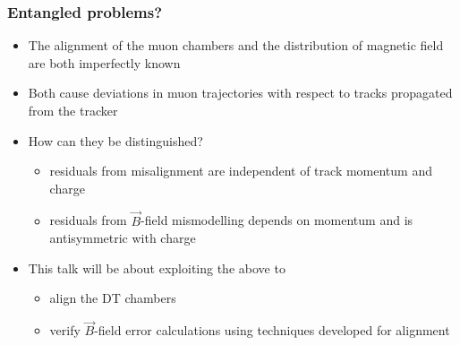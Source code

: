 \documentclass[compress]{beamer}
\begin{document}
\begin{frame}
\frametitle{Entangled problems?}
\begin{itemize}\setlength{\itemsep}{0.25 cm}
\item The alignment of the muon chambers and the distribution of
  magnetic field are both imperfectly known
\item Both cause deviations in muon trajectories with respect to
  tracks propagated from the tracker
\item How can they be distinguished?
\begin{itemize}\setlength{\itemsep}{0.1 cm}
\item residuals from misalignment are independent of track momentum and charge
\item residuals from $\vec{B}$-field mismodelling depends on momentum and is antisymmetric with charge
\end{itemize}
\item This talk will be about exploiting the above to
\begin{itemize}\setlength{\itemsep}{0.1 cm}
\item align the DT chambers
\item verify $\vec{B}$-field error calculations using techniques developed for alignment
\end{itemize}
\end{itemize}
\end{frame}
\end{document}
